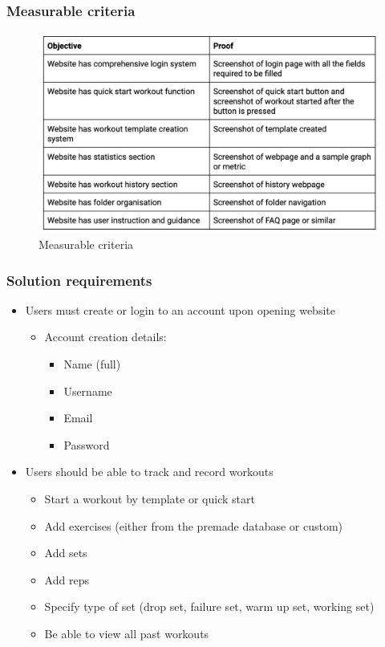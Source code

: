 \documentclass{article}
\begin{document}
\subsubsection{Measurable criteria}

\begin{figure}
  \centering
  \includegraphics[width=1\textwidth]{img/Figure 10.png}
  \caption{Measurable criteria}
\end{figure}

\newpage

\subsubsection{Solution requirements}

\begin{itemize}
  \item Users must create or login to an account upon opening website
  \begin{itemize}
    \item Account creation details:
    \begin{itemize}
      \item Name (full)
      \item Username
      \item Email
      \item Password
    \end{itemize}
  \end{itemize}
  \item Users should be able to track and record workouts
  \begin{itemize}
    \item Start a workout by template or quick start
    \item Add exercises (either from the premade database or custom)
    \item Add sets
    \item Add reps 
    \item Specify type of set (drop set, failure set, warm up set, working set)
    \item Be able to view all past workouts
  \end{itemize}
\end{itemize}
\end{document}

